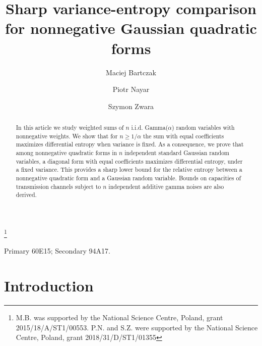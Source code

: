 \documentclass[11pt]{amsart}
\newcommand{\1}{\mathbf{1}}
\theoremstyle{definition}
\theoremstyle{definition}
\theoremstyle{remark}
\begin{document}


\title[Variance-entropy comparison for Gaussian quadratic forms  ]{Sharp variance-entropy comparison for nonnegative Gaussian quadratic forms}


\author{Maciej Bartczak}
\address{University of Warsaw}




\author{Piotr Nayar}
\thanks{M.B. was supported by the National Science 
Centre, Poland, grant 2015/18/A/ST1/00553. P.N. and S.Z. were supported by the National Science Centre, Poland, grant 2018/31/D/ST1/01355}
\address{University of Warsaw}




\author{Szymon Zwara}
\address{University of Warsaw}

\begin{abstract}
In this article we study weighted sums of $n$ i.i.d.  Gamma($\alpha$) random variables with nonnegative weights. We show that for $n \geq 1/\alpha$ the sum with equal coefficients maximizes  differential entropy when variance is fixed. As a consequence, we prove that among nonnegative quadratic forms in $n$ independent standard Gaussian random variables, a diagonal form with equal coefficients maximizes differential entropy, under a fixed variance. 
This provides a sharp lower bound for the relative entropy between a nonnegative quadratic form and a Gaussian random variable. Bounds on capacities of  transmission channels subject to $n$ independent additive gamma noises are also derived. 
\end{abstract}

\maketitle

{\footnotesize
{} Primary 60E15; Secondary 94A17.

}
\bigskip

\section{Introduction}\label{sec:intro}
\end{document}
